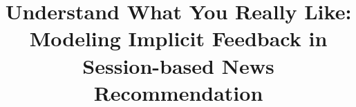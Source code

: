 \documentclass[sigconf]{acmart}
\begin{document}
\title{Understand What You Really Like: Modeling Implicit Feedback in Session-based News Recommendation}



\end{document}
